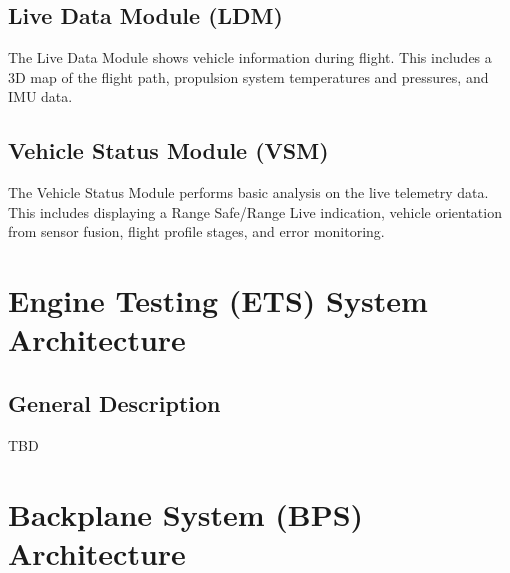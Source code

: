 \documentclass[12pt,article]{memoir}
\begin{document}
\section{Live Data Module (LDM)}
The Live Data Module shows vehicle information during flight. This includes a 3D map of the flight path, propulsion system temperatures and pressures, and IMU data.
\section{Vehicle Status Module (VSM)}
The Vehicle Status Module performs basic analysis on the live telemetry data. This includes displaying a Range Safe/Range Live indication, vehicle orientation from sensor fusion, flight profile stages, and error monitoring.
\newpage
\chapter{Engine Testing (ETS) System Architecture}
\section{General Description}
TBD
\newpage

\chapter{Backplane System (BPS) Architecture}
\end{document}
